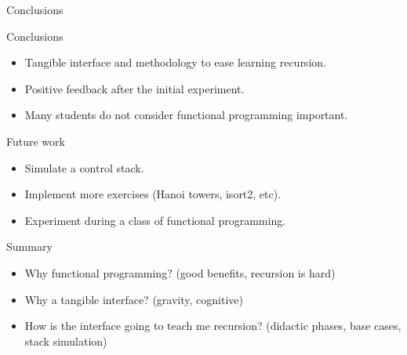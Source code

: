 \begin{frame}{Conclusions}
  \begin{block} {Conclusions}
    \begin{itemize}
    \item Tangible interface and methodology to ease learning recursion.
    \item Positive feedback after the initial experiment.
    \item Many students do not consider functional programming important.
    \end{itemize}
  \end{block}
  \begin{block} {Future work}
    \begin{itemize}
    \item Simulate a control stack.
    \item Implement more exercises (Hanoi towers, isort2, etc).
    \item Experiment during a class of functional programming.
    \end{itemize}
  \end{block}
\end{frame}

\begin{frame}{Summary}
  \begin{itemize}
  \item Why functional programming? (good benefits, recursion is hard)
  \item Why a tangible interface? (gravity, cognitive)
  \item How is the interface going to teach me recursion?
    (didactic phases, base cases, stack simulation)
  \end{itemize}
\end{frame}


